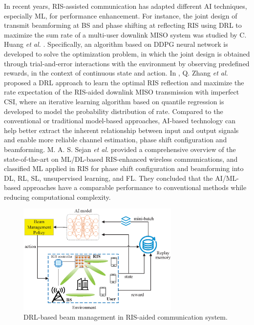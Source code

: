 \documentclass[journal,comsoc]{IEEEtran}
\begin{document}
In recent years, RIS-assisted communication has adapted different AI techniques, especially ML, for performance enhancement. For instance, the joint design of transmit beamforming at BS and phase shifting at reflecting RIS using DRL to maximize the sum rate of a multi-user downlink MISO system was studied by C. Huang \emph{et al.} \cite{RIS-Multiuser-MISO-DRL-2020}. Specifically, an algorithm based on DDPG neural network is developed to solve the optimization problem, in which the joint design is obtained through trial-and-error interactions with the environment by observing predefined rewards, in the context of continuous state and action. In \cite{Millimeter-Wave-Communications-IR-DRL-2022}, Q. Zhang \emph{et al.} proposed a DRL approach to learn the optimal RIS reflection and maximize the rate expectation of the RIS-aided downlink MISO transmission with imperfect CSI, where an iterative learning algorithm based on quantile regression is developed to model the probability distribution of rate. Compared to the conventional or traditional model-based approaches, AI-based technology can help better extract the inherent relationship between input and output signals and enable more reliable channel estimation, phase shift configuration and beamforming. M. A. S. Sejan \emph{et al.} \cite{ML-RIS-2022} provided a comprehensive overview of the state-of-the-art on ML/DL-based RIS-enhanced wireless communications, and classified ML applied in RIS for phase shift configuration and beamforming into DL, RL, SL, unsupervised learning, and FL. They concluded that the AI/ML-based approaches have a comparable performance to conventional methods while reducing computational complexity.


\begin{figure}[t]
	\centering
	\includegraphics[width=8cm]{RIS-DRL.eps}
	\caption{DRL-based beam management in RIS-aided communication system.}
	\label{fig:RIS-DRL}
\end{figure}
\end{document}
